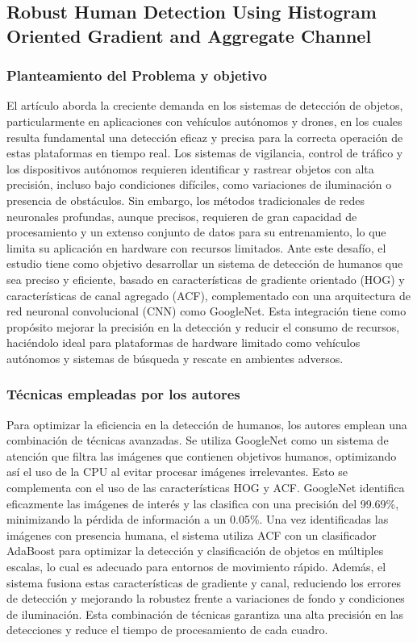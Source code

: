 \subsection{Robust Human Detection Using Histogram
Oriented Gradient and Aggregate Channel}

\subsubsection{Planteamiento del Problema y objetivo }
El artículo aborda la creciente demanda en los sistemas de detección de objetos, particularmente en aplicaciones con vehículos autónomos y drones, en los cuales resulta fundamental una detección eficaz y precisa para la correcta operación de estas plataformas en tiempo real. Los sistemas de vigilancia, control de tráfico y los dispositivos autónomos requieren identificar y rastrear objetos con alta precisión, incluso bajo condiciones difíciles, como variaciones de iluminación o presencia de obstáculos. Sin embargo, los métodos tradicionales de redes neuronales profundas, aunque precisos, requieren de gran capacidad de procesamiento y un extenso conjunto de datos para su entrenamiento, lo que limita su aplicación en hardware con recursos limitados. Ante este desafío, el estudio tiene como objetivo desarrollar un sistema de detección de humanos que sea preciso y eficiente, basado en características de gradiente orientado (HOG) y características de canal agregado (ACF), complementado con una arquitectura de red neuronal convolucional (CNN) como GoogleNet. Esta integración tiene como propósito mejorar la precisión en la detección y reducir el consumo de recursos, haciéndolo ideal para plataformas de hardware limitado como vehículos autónomos y sistemas de búsqueda y rescate en ambientes adversos.



\subsubsection{Técnicas empleadas por los autores}
Para optimizar la eficiencia en la detección de humanos, los autores emplean una combinación de técnicas avanzadas. Se utiliza GoogleNet como un sistema de atención que filtra las imágenes que contienen objetivos humanos, optimizando así el uso de la CPU al evitar procesar imágenes irrelevantes. Esto se complementa con el uso de las características HOG y ACF. GoogleNet identifica eficazmente las imágenes de interés y las clasifica con una precisión del 99.69\%, minimizando la pérdida de información a un 0.05\%. Una vez identificadas las imágenes con presencia humana, el sistema utiliza ACF con un clasificador AdaBoost para optimizar la detección y clasificación de objetos en múltiples escalas, lo cual es adecuado para entornos de movimiento rápido. Además, el sistema fusiona estas características de gradiente y canal, reduciendo los errores de detección y mejorando la robustez frente a variaciones de fondo y condiciones de iluminación. Esta combinación de técnicas garantiza una alta precisión en las detecciones y reduce el tiempo de procesamiento de cada cuadro.

